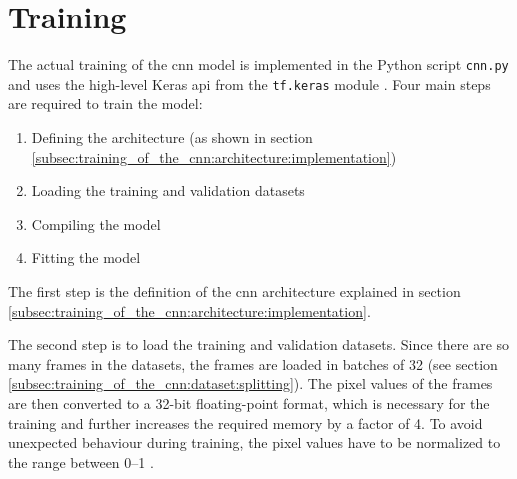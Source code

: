 \section{Training}
\label{sec:training_of_the_cnn:training}

The actual training of the \acrlong{cnn} model is implemented in the Python script \texttt{cnn.py} and uses the high-level Keras \acrshort{api} from the \texttt{tf.keras} module \cite{training_arch_tf_keras}.
Four main steps are required to train the model:

\begin{enumerate}
  \item Defining the architecture (as shown in section \ref{subsec:training_of_the_cnn:architecture:implementation})
  \item Loading the training and validation datasets
  \item Compiling the model
  \item Fitting the model
\end{enumerate}

The first step is the definition of the \acrshort{cnn} architecture explained in section \ref{subsec:training_of_the_cnn:architecture:implementation}.

The second step is to load the training and validation datasets.
Since there are so many frames in the datasets, the frames are loaded in batches of \num{32} (see section \ref{subsec:training_of_the_cnn:dataset:splitting}).
The pixel values of the frames are then converted to a 32-bit floating-point format, which is necessary for the training and further increases the required memory by a factor of \num{4}.
To avoid unexpected behaviour during training, the pixel values have to be normalized to the range between \numrange{0}{1} \cite{training_train_scaling}.

